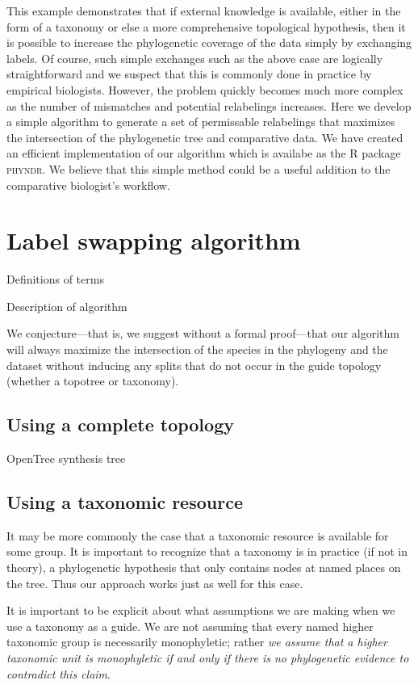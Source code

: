 \documentclass[a4paper,11pt]{article}
\begin{document}
This example demonstrates that if external knowledge is available, either in the form of a taxonomy or else a more comprehensive topological hypothesis, then it is possible to increase the phylogenetic coverage of the data simply by exchanging labels. Of course, such simple exchanges such as the above case are logically straightforward and we suspect that this is commonly done in practice by empirical biologists. However, the problem quickly becomes much more complex as the number of mismatches and potential relabelings increases. Here we develop a simple algorithm to generate a set of permissable relabelings that maximizes the intersection of the phylogenetic tree and comparative data. We have created an efficient implementation of our algorithm which is availabe as the R package \textsc{phyndr}. We believe that this simple method could be a useful addition to the comparative biologist's workflow.

\section{Label swapping algorithm}

Definitions of terms

Description of algorithm

We conjecture---that is, we suggest without a formal proof---that our algorithm will always maximize the intersection of the species in the phylogeny and the dataset without inducing any splits that do not occur in the guide topology (whether a topotree or taxonomy).

\subsection{Using a complete topology}

OpenTree synthesis tree

\subsection{Using a taxonomic resource}

It may be more commonly the case that a taxonomic resource is available for some group. It is important to recognize that a taxonomy is in practice (if not in theory), a phylogenetic hypothesis that only contains nodes at named places on the tree. Thus our approach works just as well for this case.

It is important to be explicit about what assumptions we are making when we use a taxonomy as a guide. We are not assuming that every named higher taxonomic group is necessarily monophyletic; rather \emph{we assume that a higher taxonomic unit is monophyletic if and only if there is no phylogenetic evidence to contradict this claim}.  
\end{document}
